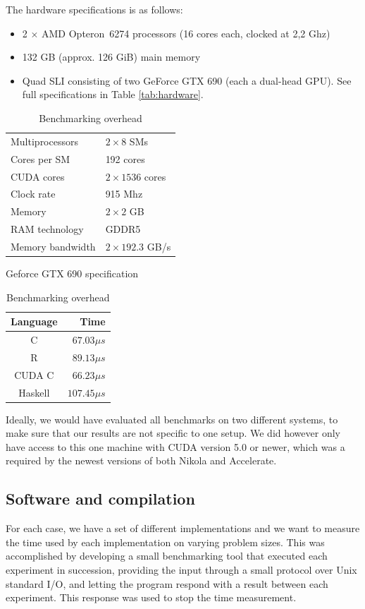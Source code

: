 The hardware specifications is as follows:
\begin{itemize}
\item 2 $\times$ AMD Opteron\texttrademark\ 6274 processors (16 cores each, clocked at 2,2 Ghz)
\item 132 GB (approx. 126 GiB) main memory
\item Quad SLI consisting of two GeForce GTX 690 (each a dual-head
  GPU). See full specifications in Table \ref{tab:hardware}.
\end{itemize}
\begin{table}
\begin{minipage}[b]{0.50\linewidth}
  \centering
  \begin{tabular}{ll}
    Multiprocessors & $2 \times 8$ SMs\\
    Cores per SM & 192 cores \\
    CUDA cores & $2 \times 1536$ cores\\
    Clock rate & 915 Mhz \\
    Memory & $2 \times 2$ GB \\
    RAM technology & GDDR5 \\
    Memory bandwidth & $2 \times 192.3$ GB/s \\
    \hline
  \end{tabular}
  \caption{Geforce GTX 690 specification}
  \label{tab:hardware}
\end{minipage}
\begin{minipage}[b]{0.50\linewidth}
  \centering
  \begin{tabular}{cr}
    \textbf{Language} & \textbf{Time}  \\ \hline
    C & $67.03 \mu s$ \\
    R & $89.13 \mu s$ \\
    CUDA C & $66.23 \mu s$ \\
    Haskell & $107.45 \mu s$ \\ \hline
  \end{tabular}
  \caption{Benchmarking overhead}
  \label{tab:benchmarking-overhead}
\end{minipage}
\end{table}

Ideally, we would have evaluated all benchmarks on two different
systems, to make sure that our results are not specific to one
setup. We did however only have access to this one machine with CUDA
version 5.0 or newer, which was a required by the newest versions of
both Nikola and Accelerate.

\subsection{Software and compilation}
For each case, we have a set of different implementations and we want
to measure the time used by each implementation on varying problem
sizes. This was accomplished by developing a small benchmarking tool
 that executed each
experiment in succession, providing the input through a small protocol
over Unix standard I/O, and letting the program respond with a result
between each experiment. This response was used to stop the time
measurement.

